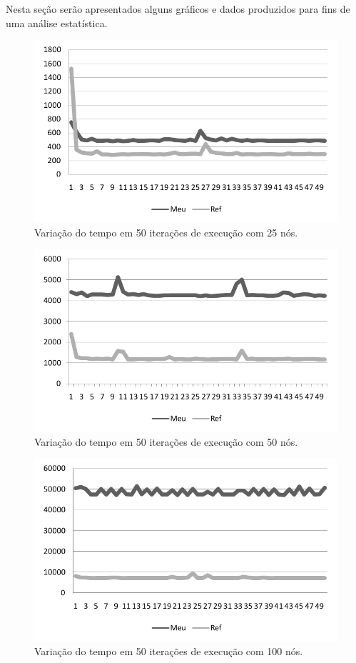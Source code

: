 \documentclass{acm_proc_article-sp}
\begin{document}
Nesta seção serão apresentados alguns gráficos e dados produzidos para fins de uma análise estatística.
 
\begin{figure}[h]%
\centering
\includegraphics[scale=.3]{img/25nos.png}
\caption{Variação do tempo em 50 iterações de execução com 25 nós.}
\label{25nos}
\end{figure}

\begin{figure}[h]%
\centering
\includegraphics[scale=.3]{img/50nos.png}
\caption{Variação do tempo em 50 iterações de execução com 50 nós.}
\label{50nos}
\end{figure}

\begin{figure}[h]%
\centering
\includegraphics[scale=.3]{img/100nos.png}
\caption{Variação do tempo em 50 iterações de execução com 100 nós.}
\label{100nos}
\end{figure}
\end{document}
